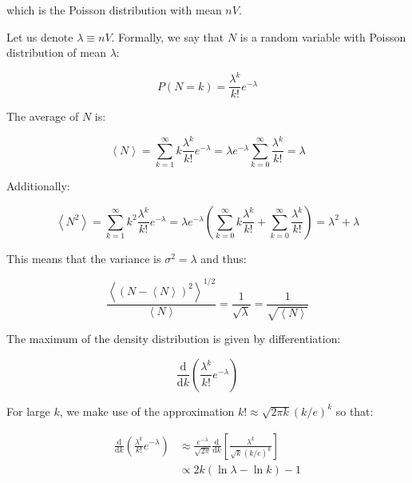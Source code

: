\documentclass[12pt]{article}
\begin{document}
which is the Poisson distribution with mean $nV$.

Let us denote $\lambda \equiv nV$. Formally, we say that $N$ is a random variable with Poisson distribution of mean $\lambda$:

\begin{equation}
    P(N = k) = \frac{\lambda^{k}}{k!} e^{-\lambda}
\end{equation}

The average of $N$ is:

\begin{equation}
    \left\langle N \right\rangle = \sum_{k=1}^{\infty} k \frac{\lambda^{k}}{k!} e^{-\lambda} = \lambda e^{-\lambda} \sum_{k=0}^{\infty} \frac{\lambda^{k}}{k!} = \lambda
\end{equation}

Additionally:

\begin{equation}
    \left\langle N^{2} \right\rangle = \sum_{k=1}^{\infty} k^{2} \frac{\lambda^{k}}{k!} e^{-\lambda} = \lambda e^{-\lambda} \left( \sum_{k=0}^{\infty} k \frac{\lambda^{k}}{k!} + \sum_{k=0}^{\infty} \frac{\lambda^{k}}{k!} \right) = \lambda^{2} + \lambda
\end{equation}

This means that the variance is $\sigma^{2} = \lambda$ and thus:

\begin{equation}
    \frac{\left\langle (N - \left\langle N \right\rangle)^{2} \right\rangle^{1/2}}{\left\langle N \right\rangle} = \frac{1}{\sqrt{\lambda}} = \frac{1}{\sqrt{\left\langle N \right\rangle}}
\end{equation}

The maximum of the density distribution is given by differentiation:

\begin{equation}
    \frac{\mathrm{d}}{\mathrm{d}k} \left( \frac{\lambda^{k}}{k!} e^{-\lambda} \right)
\end{equation}

For large $k$, we make use of the approximation $k! \approx \sqrt{2\pi k} (k/e)^{k}$ so that:

\begin{equation}
    \begin{split}
        \frac{\mathrm{d}}{\mathrm{d}k} \left( \frac{\lambda^{k}}{k!} e^{-\lambda} \right) &\approx \frac{e^{-\lambda}}{\sqrt{2\pi}} \frac{\mathrm{d}}{\mathrm{d}k} \left[ \frac{\lambda^{k}}{\sqrt{k} (k/e)^{k}} \right] \\
        &\propto 2k (\ln{\lambda} - \ln{k}) - 1
    \end{split}
\end{equation}
\end{document}
